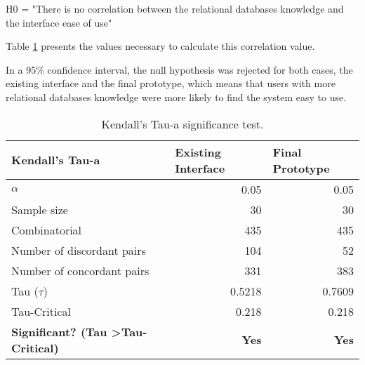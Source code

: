\begin{center}
  H0 = "There is no correlation between the relational databases knowledge and the interface ease of use"
\end{center}

Table \ref{tab:kendall-test} presents the values necessary to calculate this correlation value. 

In a 95\% confidence interval, the null hypothesis was rejected for both cases, the existing interface and the final prototype, which means that users with more relational databases knowledge were more likely to find the system easy to use.

\begin{table}[tb]
  \caption{Kendall's Tau-a significance test.}
	\label{tab:kendall-test}
  \begin{tabular}{@{}lrr@{}}
  \toprule
  \textbf{Kendall's Tau-a}                              & \multicolumn{1}{l}{\textbf{Existing Interface}} & \multicolumn{1}{l}{\textbf{Final Prototype}} \\ \midrule
  $\alpha$                                                 & 0.05                                            & 0.05                                         \\ \midrule
  Sample size                                           & 30                                              & 30                                           \\ \midrule
  Combinatorial                                         & 435                                             & 435                                          \\ \midrule
  Number of discordant pairs                            & 104                                             & 52                                           \\ \midrule
  Number of concordant pairs                            & 331                                             & 383                                          \\ \midrule
  Tau ($\tau$)                                                   & 0.5218                                          & 0.7609                                       \\ \midrule
  Tau-Critical                                          & 0.218                                           & 0.218                                        \\ \midrule
  \textbf{Significant? (Tau \textgreater Tau-Critical)} & \textbf{Yes}                                    & \textbf{Yes}                                 \\ \bottomrule
  \end{tabular}
  \end{table}

